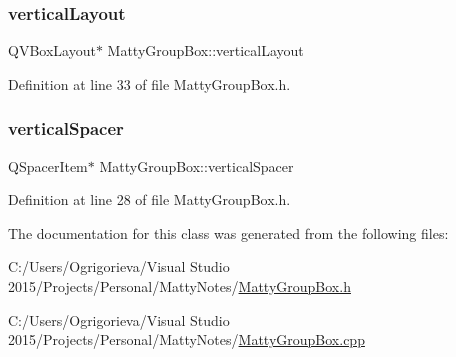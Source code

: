 \subsubsection{\texorpdfstring{vertical\+Layout}{verticalLayout}}
{\footnotesize\ttfamily Q\+V\+Box\+Layout$\ast$ Matty\+Group\+Box\+::vertical\+Layout\hspace{0.3cm}{\ttfamily [private]}}



Definition at line 33 of file Matty\+Group\+Box.\+h.

\hypertarget{classMattyGroupBox_ae622d8330b00272995af1d41ce037b4c}{}\label{classMattyGroupBox_ae622d8330b00272995af1d41ce037b4c} 
\subsubsection{\texorpdfstring{vertical\+Spacer}{verticalSpacer}}
{\footnotesize\ttfamily Q\+Spacer\+Item$\ast$ Matty\+Group\+Box\+::vertical\+Spacer\hspace{0.3cm}{\ttfamily [private]}}



Definition at line 28 of file Matty\+Group\+Box.\+h.



The documentation for this class was generated from the following files\+:\begin{DoxyCompactItemize}
\item 
C\+:/\+Users/\+Ogrigorieva/\+Visual Studio 2015/\+Projects/\+Personal/\+Matty\+Notes/\hyperlink{MattyGroupBox_8h}{Matty\+Group\+Box.\+h}\item 
C\+:/\+Users/\+Ogrigorieva/\+Visual Studio 2015/\+Projects/\+Personal/\+Matty\+Notes/\hyperlink{MattyGroupBox_8cpp}{Matty\+Group\+Box.\+cpp}\end{DoxyCompactItemize}
